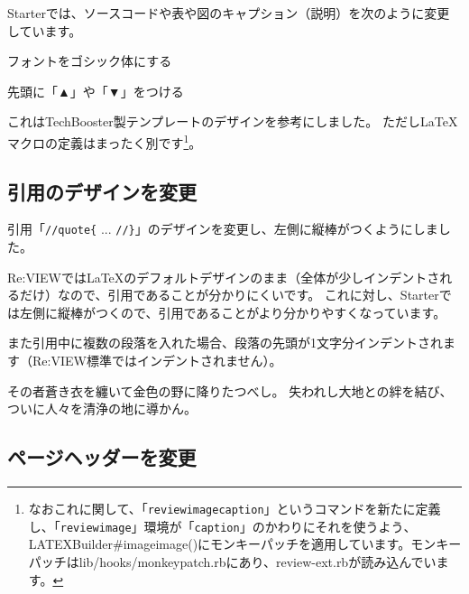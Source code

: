 Starterでは、ソースコードや表や図のキャプション（説明）を次のように変更しています。

\begin{starteritemize}
\item フォントをゴシック体にする
\item 先頭に「▲」や「▼」をつける
\end{starteritemize}

これはTechBooster製テンプレートのデザインを参考にしました。
ただし\LaTeX{}マクロの定義はまったく別です\footnote{なおこれに関して、「\texttt{\reviewbackslash{}reviewimagecaption}」というコマンドを新たに定義し、「\texttt{\reviewbackslash{}reviewimage}」環境が「\texttt{\reviewbackslash{}caption}」のかわりにそれを使うよう、LATEXBuilder\#image\textunderscore{}image()にモンキーパッチを適用しています。モンキーパッチはlib/hooks/monkeypatch.rbにあり、review{-}ext.rbが読み込んでいます。}。

\subsection*{引用のデザインを変更}
\label{sec:1-2-12}

引用「\texttt{//quote\{} ... \texttt{//\}}」のデザインを変更し、左側に縦棒がつくようにしました。

Re:VIEWでは\LaTeX{}のデフォルトデザインのまま（全体が少しインデントされるだけ）なので、引用であることが分かりにくいです。
これに対し、Starterでは左側に縦棒がつくので、引用であることがより分かりやすくなっています。

また引用中に複数の段落を入れた場合、段落の先頭が1文字分インデントされます（Re:VIEW標準ではインデントされません）。

\begin{starterprogram}\end{starterprogram}
\noindent
{}

\starterresult
\begin{starterquote}

その者蒼き衣を纏いて金色の野に降りたつべし。
失われし大地との絆を結び、ついに人々を清浄の地に導かん。

\end{starterquote}
\endstarterresult

\subsection*{ページヘッダーを変更}
\label{sec:1-2-13}

